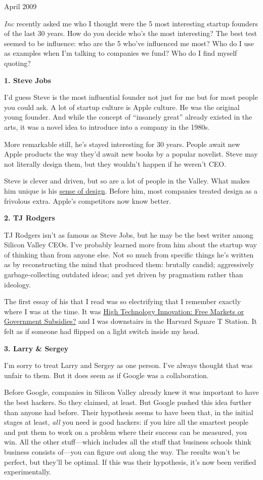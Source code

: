 April 2009

\emph{Inc} recently asked me who I thought were the 5 most interesting
startup founders of the last 30 years. How do you decide who's the most
interesting? The best test seemed to be influence: who are the 5 who've
influenced me most? Who do I use as examples when I'm talking to
companies we fund? Who do I find myself quoting?

\textbf{1. Steve Jobs}

I'd guess Steve is the most influential founder not just for me but for
most people you could ask. A lot of startup culture is Apple culture. He
was the original young founder. And while the concept of ``insanely
great'' already existed in the arts, it was a novel idea to introduce
into a company in the 1980s.

More remarkable still, he's stayed interesting for 30 years. People
await new Apple products the way they'd await new books by a popular
novelist. Steve may not literally design them, but they wouldn't happen
if he weren't CEO.

Steve is clever and driven, but so are a lot of people in the Valley.
What makes him unique is his \href{taste.html}{sense of design}. Before
him, most companies treated design as a frivolous extra. Apple's
competitors now know better.

\textbf{2. TJ Rodgers}

TJ Rodgers isn't as famous as Steve Jobs, but he may be the best writer
among Silicon Valley CEOs. I've probably learned more from him about the
startup way of thinking than from anyone else. Not so much from specific
things he's written as by reconstructing the mind that produced them:
brutally candid; aggressively garbage-collecting outdated ideas; and yet
driven by pragmatism rather than ideology.

The first essay of his that I read was so electrifying that I remember
exactly where I was at the time. It was
\href{http://www.cypress.com/?rID=34993}{High Technology Innovation:
Free Markets or Government Subsidies?} and I was downstairs in the
Harvard Square T Station. It felt as if someone had flipped on a light
switch inside my head.

\textbf{3. Larry \& Sergey}

I'm sorry to treat Larry and Sergey as one person. I've always thought
that was unfair to them. But it does seem as if Google was a
collaboration.

Before Google, companies in Silicon Valley already knew it was important
to have the best hackers. So they claimed, at least. But Google pushed
this idea further than anyone had before. Their hypothesis seems to have
been that, in the initial stages at least, \emph{all} you need is good
hackers: if you hire all the smartest people and put them to work on a
problem where their success can be measured, you win. All the other
stuff---which includes all the stuff that business schools think
business consists of---you can figure out along the way. The results
won't be perfect, but they'll be optimal. If this was their hypothesis,
it's now been verified experimentally.

